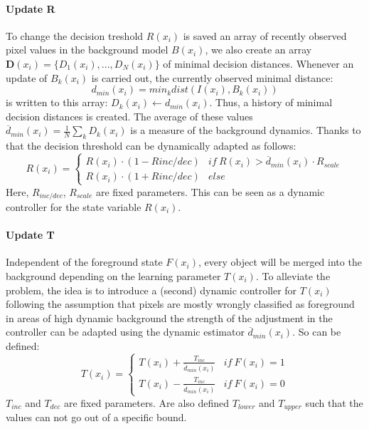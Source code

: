 \paragraph{Update R}
To change the decision treshold $R(x_i)$ is saved an array of recently observed pixel values in the background model $B(x_i)$, we also create an array $\mathbf{D}(x_i) = \{D_1(x_i ),...,D_N(x_i)\}$ of minimal decision distances. Whenever an update of $B_k(x_i)$ is carried out, the currently observed minimal distance:
\[ d_{min}(x_i) = min_k dist(I(x_i), B_k(x_i)) \] is written to this array: $D_k(x_i) \leftarrow d_{min}(x_i)$. Thus, a history of minimal decision distances is created. The average of these values $\overline{d}_{min}(x_i) = \frac{1}{N} \sum_k D_k(x_i)$ is a measure of the background dynamics. Thanks to that
the decision threshold can be dynamically adapted as follows:
\begin{equation} \label{eq:R}
R(x_i)=\begin{cases} R(x_i)\cdot(1-R{inc/dec}) &if\ R(x_i)> \overline{d}_{min}(x_i)\cdot R_{scale} \\ R(x_i)\cdot (1+R{inc/dec}) &else  \end{cases}
\end{equation}
Here, $R_{inc/dec}$, $R_{scale}$ are fixed parameters. This can be seen as a dynamic controller for the state variable $R(x_i)$.
\paragraph{Update T}
Independent of the foreground state $F(x_i)$, every object will be merged into the background depending on the learning parameter
$T(x_i)$. To alleviate the problem, the idea is to introduce a
(second) dynamic controller for $T(x_i)$ following the assumption that pixels are mostly wrongly classified as foreground in areas of high dynamic background the strength of the adjustment in the controller can be adapted using the dynamic estimator $\overline{d}_{min}(x_i)$. So can be defined:
\begin{equation}
T(x_i)=\begin{cases} T(x_i)+\frac{T_{inc}}{\overline{d}_{min}(x_i)} &if \ F(x_i)=1 \\ T(x_i)-\frac{T_{inc}}{\overline{d}_{min}(x_i)} &if \ F(x_i)=0 \end{cases}
\end{equation}
$T_{inc}$ and $T_{dec}$ are fixed parameters. Are also defined $T_{lower}$ and $T_{upper}$ such that the values can not go out of a specific bound.
